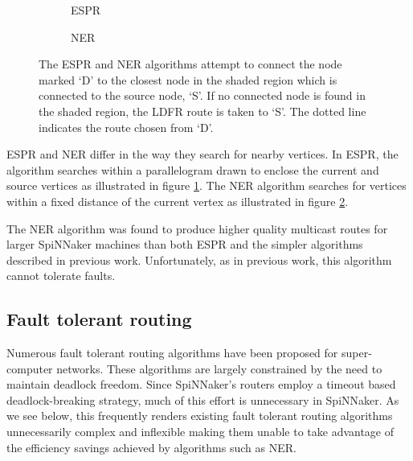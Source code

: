			\begin{figure}
				\center
				\begin{subfigure}{0.45\linewidth}
					\center
					
					\caption{ESPR}
					\label{fig:search-regions-espr}
				\end{subfigure}
				\begin{subfigure}{0.45\linewidth}
					\center
					
					\caption{NER}
					\label{fig:search-regions-ner}
				\end{subfigure}
				
				\caption{The ESPR and NER algorithms attempt to connect the node marked
				`D' to the closest node in the shaded region which is connected to the
				source node, `S'. If no connected node is found in the shaded region, the
				LDFR route is taken to `S'. The dotted line indicates the route chosen
				from `D'.}
				\label{fig:search-regions}
			\end{figure}
			
			ESPR and NER differ in the way they search for nearby vertices. In ESPR,
			the algorithm searches within a parallelogram drawn to enclose the
			current and source vertices as illustrated in figure
			\ref{fig:search-regions-espr}. The NER algorithm searches for vertices
			within a fixed distance of the current vertex as illustrated in figure
			\ref{fig:search-regions-ner}.
			
			The NER algorithm was found to produce higher quality multicast routes
			for larger SpiNNaker machines than both ESPR and the simpler algorithms
			described in previous work. Unfortunately, as in previous work, this
			algorithm cannot tolerate faults.
			
		\subsection{Fault tolerant routing}
			
			Numerous fault tolerant routing algorithms have been proposed for
			super-computer networks. These algorithms are largely constrained by the
			need to maintain deadlock freedom. Since SpiNNaker's routers employ a
			timeout based deadlock-breaking strategy, much of this effort is
			unnecessary in SpiNNaker. As we see below, this frequently renders
			existing fault tolerant routing algorithms unnecessarily complex and
			inflexible making them unable to take advantage of the efficiency savings
			achieved by algorithms such as NER.
			
